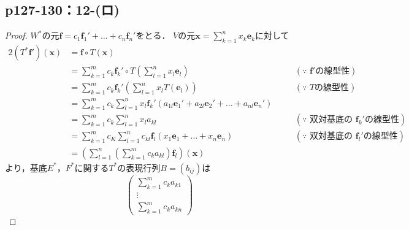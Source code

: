 \documentclass[a4paper,10pt,fleqn]{ltjsarticle}
\begin{document}
\subsection*{p127-130：12-(ロ)}

\begin{tleftbar}
    \begin{proof}
        $ W^\ast$の元$\bm{f}= c_1 \bm{f}_1' + \dots + c_n \bm{f}_n'$をとる．
        $V$の元$\bm{x} =\sum_{k=1}^{n} x_k \bm{e}_k$に対して
        \begin{alignat*}{2}
            (T^\ast \bm{f}') (\bm{x}) & = \bm{f} \circ T(\bm{x})                                                                                                & \quad &                                              \\
                                      & = \sum_{k=1}^{m} c_k \bm{f}_k ' \circ T \left( \sum_{l=1}^{n} x_l \bm{e}_l \right)                                      & \quad & (\text{$\because$~$\bm{f}'$の線型性})            \\
                                      & = \sum_{k=1}^{m} c_k \bm{f}_k ' \left( \sum_{l=1}^{n} x_l T (\bm{e}_l) \right)                                          & \quad & (\text{$\because$~$T$の線型性})                  \\
                                      & = \sum_{k=1}^{m} c_k \sum_{l=1}^{n} x_l \bm{f}_k ' (a_{1l} \bm{e}_1 ' + a_{2l} \bm{e}_2 ' + \dots + a_{nl} \bm{e}_n ' ) & \quad &                                              \\
                                      & = \sum_{k=1}^{m} c_k \sum_{l=1}^{n} x_l a_{kl}                                                                          & \quad & (\text{$\because$~双対基底の定義と$\bm{f}_k '$の線型性}) \\
                                      & = \sum_{k=1}^{m} c_K \sum_{l=1}^{n} c_{kl} \bm{f}_l ( x_1 \bm{e}_1 + \dots + x_n \bm{e}_n)                              &       & (\text{$\because$~双対基底の定義と$\bm{f}_l '$の線型性}) \\
                                      & = \left( \sum_{l=1}^{n} \left( \sum_{k=1}^{m} c_k a_{kl} \right) \bm{f}_l\right) (\bm{x})
        \end{alignat*}
        より，基底$E^\ast$，$F^\ast$に関する$T^\ast$の表現行列$B= (b_{ij})$は
        \[
            \begin{pmatrix} \sum_{k=1}^{m} c_k a_{k1} \\ \vdots \\ \sum_{k=1}^{m} c_k a_{kn} \end{pmatrix}
\]
\end{proof}
\end{tleftbar}
\end{document}
